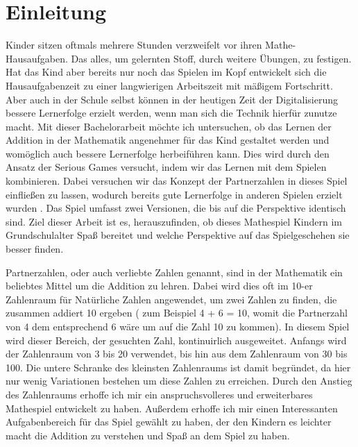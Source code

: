
\chapter{Einleitung}
Kinder sitzen oftmals mehrere Stunden verzweifelt vor ihren Mathe-Hausaufgaben. Das alles, um gelernten Stoff, durch weitere Übungen, zu festigen. Hat das Kind aber bereits nur noch das Spielen im Kopf entwickelt sich die Hausaufgabenzeit zu einer langwierigen Arbeitszeit mit mäßigem Fortschritt. Aber auch in der Schule selbst können in der heutigen Zeit der Digitalisierung bessere Lernerfolge erzielt werden, wenn man sich die Technik hierfür zunutze macht. Mit dieser Bachelorarbeit möchte ich untersuchen, ob das Lernen der Addition in der Mathematik angenehmer für das Kind gestaltet werden und womöglich auch bessere Lernerfolge herbeiführen kann. Dies wird durch den Ansatz der Serious Games versucht, indem wir das Lernen mit dem Spielen kombinieren. Dabei versuchen wir das Konzept der Partnerzahlen in dieses Spiel einfließen zu lassen, wodurch bereits gute Lernerfolge in anderen Spielen erzielt wurden \cite{Jung2016}. Das Spiel umfasst zwei Versionen, die bis auf die Perspektive identisch sind. Ziel dieser Arbeit ist es, herauszufinden, ob dieses Mathespiel Kindern im Grundschulalter Spaß bereitet und welche Perspektive auf das Spielgeschehen sie besser finden.

Partnerzahlen, oder auch verliebte Zahlen genannt, sind in der Mathematik ein beliebtes Mittel um die Addition zu lehren. Dabei wird dies oft im 10-er Zahlenraum für Natürliche Zahlen angewendet, um zwei Zahlen zu finden, die zusammen addiert 10 ergeben ( zum Beispiel 4 + 6 = 10, womit die Partnerzahl von 4 dem entsprechend 6 wäre um auf die Zahl 10 zu kommen). In diesem Spiel wird dieser Bereich, der gesuchten Zahl, kontinuirlich ausgeweitet. Anfangs wird der Zahlenraum von 3 bis 20 verwendet, bis hin aus dem Zahlenraum von 30 bis 100. Die untere Schranke des kleinsten Zahlenraums ist damit begründet, da hier nur wenig Variationen bestehen um diese Zahlen zu erreichen. Durch den Anstieg des Zahlenraums erhoffe ich mir ein anspruchsvolleres und erweiterbares Mathespiel entwickelt zu haben. Außerdem erhoffe ich mir einen Interessanten Aufgabenbereich für das Spiel gewählt zu haben, der den Kindern es leichter macht die Addition zu verstehen und Spaß an dem Spiel zu haben.

